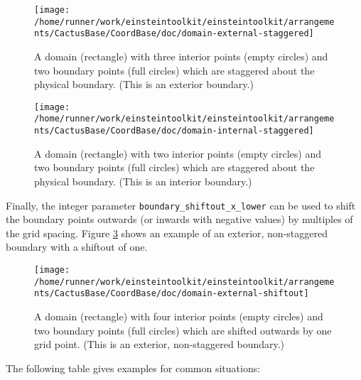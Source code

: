 \begin{figure}
\begin{center}
\texttt{[image: /home/runner/work/einsteintoolkit/einsteintoolkit/arrangements/CactusBase/CoordBase/doc/domain-external-staggered]}
\end{center}
\caption{A domain (rectangle) with three interior points (empty circles)
and two boundary points (full circles) which are staggered about the
physical boundary.  (This is an exterior boundary.)}
\label{CactusBase:CoordBase:fig-domain-external-staggered}
\end{figure}

\begin{figure}
\begin{center}
\texttt{[image: /home/runner/work/einsteintoolkit/einsteintoolkit/arrangements/CactusBase/CoordBase/doc/domain-internal-staggered]}
\end{center}
\caption{A domain (rectangle) with two interior points (empty circles)
and two boundary points (full circles) which are staggered about the
physical boundary.  (This is an interior boundary.)}
\label{CactusBase:CoordBase:fig-domain-internal-staggered}
\end{figure}

Finally, the integer parameter {\texttt{boundary\_shiftout\_x\_lower}}
can be used to shift the boundary points outwards (or inwards with
negative values) by multiples of the grid spacing.  Figure
{\ref{CactusBase:CoordBase:fig-domain-external-shiftout}} shows an
example of an exterior, non-staggered boundary with a shiftout of one.

\begin{figure}
\begin{center}
\texttt{[image: /home/runner/work/einsteintoolkit/einsteintoolkit/arrangements/CactusBase/CoordBase/doc/domain-external-shiftout]}
\end{center}
\caption{A domain (rectangle) with four interior points (empty circles)
and two boundary points (full circles) which are shifted outwards by
one grid point.  (This is an exterior, non-staggered boundary.)}
\label{CactusBase:CoordBase:fig-domain-external-shiftout}
\end{figure}

The following table gives examples for common situations:

